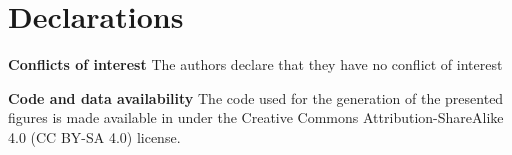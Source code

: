 \section*{Declarations}
\noindent\textbf{Conflicts of interest} The authors declare that they have no conflict of interest

\noindent\textbf{Code and data availability} The code used for the generation of the presented figures is made available in \cite{FigureMaker} under the Creative Commons Attribution-ShareAlike 4.0 (CC BY-SA 4.0) license.

%
%



